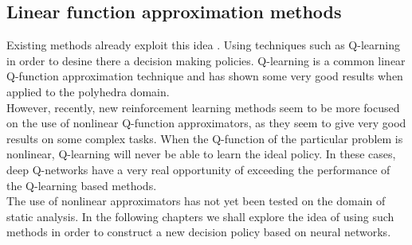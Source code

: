 \subsection{Linear function approximation methods}
Existing methods already exploit this idea \cite{singh2018fast}. Using techniques such as Q-learning in order to desine there a decision making policies. Q-learning is a common linear Q-function approximation technique and has shown some very good results when applied to the polyhedra domain.\\
However, recently, new reinforcement learning methods seem to be more focused on the use of nonlinear Q-function approximators, as they seem to give very good results on some  complex tasks. When the Q-function of the particular problem is nonlinear, Q-learning will never be able to learn the ideal policy. In these cases, deep Q-networks have a very real opportunity of exceeding the performance of the Q-learning based methods.\\
The use of nonlinear approximators has not yet been tested on the domain of static analysis. In the following chapters we shall explore the idea of using such methods in order to construct a new decision policy based on neural networks.
















